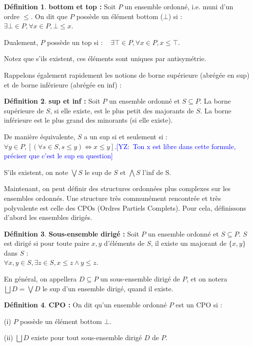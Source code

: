 \documentclass{article}
\newcommand{\yz}[1]{\textcolor{blue}{{[YZ:~#1]}}}
\theoremstyle{definition}
\newtheorem{definition}{Définition}[section]
\begin{document}
\begin{definition}{\textbf{bottom et top : }}
Soit $P$ un ensemble ordonné, i.e. muni d'un ordre $\leq$. On dit que $P$ possède un élément bottom ($\bot$) si : ~ $\exists \bot \in P, \forall x \in P, \bot \leq x$.

\noindent Dualement, $P$ possède un top si : ~ $\exists \top \in P, \forall x \in P, x \leq \top$.

Notez que s'ils existent, ces éléments sont uniques par antisymétrie.
\end{definition}

Rappelons également rapidement les notions de borne supérieure (abrégée en sup) et de borne inférieure (abrégée en inf) :

\begin{definition}{\textbf{sup et inf : }}
Soit $P$ un ensemble ordonné et $S \subseteq P$. La borne supérieure de $S$, si elle existe, est le plus petit des majorants de $S$. La borne inférieure est le plus grand des minorants (si elle existe).

De manière équivalente, $S$ a un sup si et seulement si : ~ $\forall y \in P,
[(\forall s \in S, s \leq y) \Longleftrightarrow x \leq y]$.\yz{Ton x est libre
  dans cette formule, préciser que c'est le sup en question}

S'ils existent, on note $\bigvee S$ le sup de $S$ et $\bigwedge S$ l'inf de S.
\end{definition}

Maintenant, on peut définir des structures ordonnées plus complexes sur les ensembles ordonnés. Une structure très communément rencontrée et très polyvalente est celle des CPOs (Ordres Partiels Complets). Pour cela, définissons d'abord les ensembles dirigés.

\begin{definition}{\textbf{Sous-ensemble dirigé : }}
Soit $P$ un ensemble ordonné et $S \subseteq P$. $S$ est dirigé si pour toute paire $x,y$ d'éléments de $S$, il existe un majorant de $\{x, y\}$ dans $S$ :\\ $\forall x, y \in S, \exists z \in S, x \leq z \wedge y \leq z$.

En général, on appellera $D \subseteq P$ un sous-ensemble dirigé de $P$, et on notera $\bigsqcup D = \bigvee D$ le sup d'un ensemble dirigé, quand il existe.
\end{definition}

\begin{definition}{\textbf{CPO :}}
On dit qu'un ensemble ordonné $P$ est un CPO si :

(i) $P$ possède un élément bottom $\bot$.

(ii) $\bigsqcup D$ existe pour tout sous-ensemble dirigé $D$ de $P$.
\end{definition}
\end{document}
